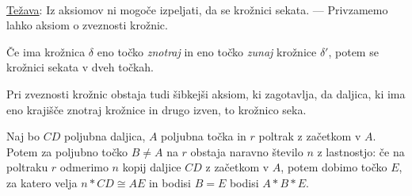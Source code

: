         \\ \underline{Težava}: Iz aksiomov ni mogoče izpeljati, da se krožnici sekata. --- Privzamemo lahko aksiom o zveznosti krožnic.
    
    \begin{aksiom}
        Če ima krožnica $\delta$ eno točko \textit{znotraj} in eno točko \textit{zunaj} krožnice $\delta'$, potem se krožnici sekata v dveh točkah.
    \end{aksiom}

        Pri zveznosti krožnic obstaja tudi šibkejši aksiom, ki zagotavlja, da daljica, ki ima eno krajišče znotraj krožnice in drugo izven, to krožnico seka.


    \begin{aksiom}[Arhimed]
        Naj bo $CD$ poljubna daljica, $A$ poljubna točka in $r$ poltrak z začetkom v $A$.
        Potem za poljubno točko $B\neq A$ na $r$ obstaja naravno število $n$ z lastnostjo: če na poltraku $r$ odmerimo $n$ kopij daljice $CD$ z začetkom v $A$, potem dobimo točko $E$, za katero velja $n*CD\cong AE$ in bodisi $B=E$ bodisi $A\ast B\ast E$.
    \end{aksiom}

